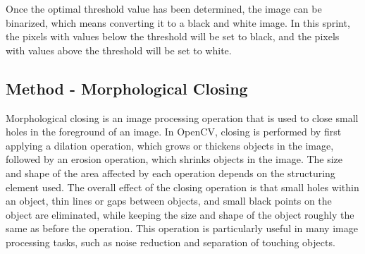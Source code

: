 Once the optimal threshold value has been determined, the image can be binarized, which means converting it to a black and white image. In this sprint, the pixels with values below the threshold will be set to black, and the pixels with values above the threshold will be set to white.

\newpage

\subsection*{Method - Morphological Closing}

Morphological closing is an image processing operation that is used to close small holes in the foreground of an image. In OpenCV, closing is performed by first applying a dilation operation, which grows or thickens objects in the image, followed by an erosion operation, which shrinks objects in the image. The size and shape of the area affected by each operation depends on the structuring element used. The overall effect of the closing operation is that small holes within an object, thin lines or gaps between objects, and small black points on the object are eliminated, while keeping the size and shape of the object roughly the same as before the operation. This operation is particularly useful in many image processing tasks, such as noise reduction and separation of touching objects. \cite{haralickImageAnalysisUsing1987}

